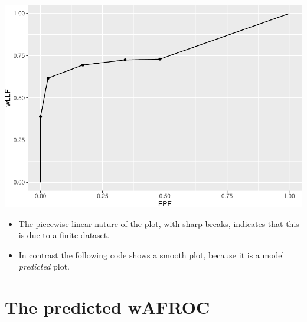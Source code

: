 \documentclass[]{book}
\newenvironment{Shaded}{\begin{snugshade}}{\end{snugshade}}
\newcommand{\DataTypeTok}[1]{\textcolor[rgb]{0.13,0.29,0.53}{#1}}
\newcommand{\KeywordTok}[1]{\textcolor[rgb]{0.13,0.29,0.53}{\textbf{#1}}}
\newcommand{\NormalTok}[1]{#1}
\newcommand{\OperatorTok}[1]{\textcolor[rgb]{0.81,0.36,0.00}{\textbf{#1}}}
\newcommand{\StringTok}[1]{\textcolor[rgb]{0.31,0.60,0.02}{#1}}
\providecommand{\tightlist}{%
  \setlength{\itemsep}{0pt}\setlength{\parskip}{0pt}}
\begin{document}
\begin{Shaded}
\end{Shaded}

\includegraphics{19-PlotRsmOpCh_files/figure-latex/unnamed-chunk-2-1.pdf}

\begin{itemize}
\tightlist
\item
  The piecewise linear nature of the plot, with sharp breaks, indicates that this is due to a finite dataset.
\item
  In contrast the following code shows a smooth plot, because it is a model \emph{predicted} plot.
\end{itemize}

\hypertarget{the-predicted-wafroc}{%
\section{The predicted wAFROC}\label{the-predicted-wafroc}}
\end{document}

